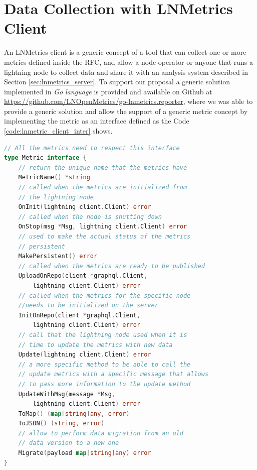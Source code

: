 \section{Data Collection with LNMetrics Client}
\label{sec:lnmetrics_client}

An LNMetrics client is a generic concept of a tool that can collect one or more metrics 
defined inside the RFC, and allow a node operator or anyone that runs a lightning node
to collect data and share it with an analysis system described in Section \ref{sec:lnmetrics_server}.
To support our proposal a generic solution implemented in \emph{Go language} is provided 
and available on Github at \url{https://github.com/LNOpenMetrics/go-lnmetrics.reporter}, where we was able 
to provide a generic solution and allow the support of a generic metric concept 
by implementing the metric as an interface defined as the Code \ref{code:lnmetric_client_inter} shows.

\begin{lstlisting}[language=go, basicstyle=\small,
                  caption={Metric interface provided in our client reference implementation.}, 
                  label={code:lnmetric_client_inter}]
// All the metrics need to respect this interface
type Metric interface {
    // return the unique name that the metrics have
    MetricName() *string
    // called when the metrics are initialized from 
    // the lightning node
    OnInit(lightning client.Client) error
    // called when the node is shutting down
    OnStop(msg *Msg, lightning client.Client) error
    // used to make the actual status of the metrics
    // persistent
    MakePersistent() error
    // called when the metrics are ready to be published
    UploadOnRepo(client *graphql.Client, 
        lightning client.Client) error
    // called when the metrics for the specific node 
    //needs to be initialized on the server
    InitOnRepo(client *graphql.Client, 
        lightning client.Client) error
    // call that the lightning node used when it is 
    // time to update the metrics with new data
    Update(lightning client.Client) error
    // a more specific method to be able to call the 
    // update metrics with a specific message that allows 
    // to pass more information to the update method
    UpdateWithMsg(message *Msg, 
        lightning client.Client) error
    ToMap() (map[string]any, error)
    ToJSON() (string, error)
    // allow to perform data migration from an old 
    // data version to a new one
    Migrate(payload map[string]any) error
}
\end{lstlisting}

